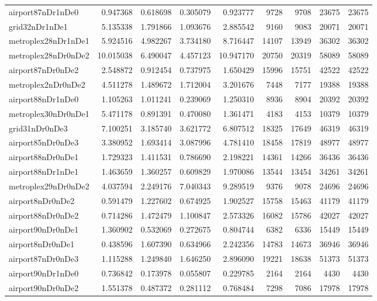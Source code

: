 \begin{longtable}{|l|r|r|r|r|r|r|r|r|}
airport87nDr1nDe0 & 0.947368 & 0.618698 & 0.305079 & 0.923777 & 9728 & 9708 & 23675 & 23675 \\
grid32nDr1nDe1 & 5.135338 & 1.791866 & 1.093676 & 2.885542 & 9160 & 9083 & 20071 & 20071 \\
metroplex28nDr1nDe1 & 5.924516 & 4.982267 & 3.734180 & 8.716447 & 14107 & 13949 & 36302 & 36302 \\
metroplex28nDr0nDe2 & 10.015038 & 6.490047 & 4.457123 & 10.947170 & 20750 & 20319 & 58089 & 58089 \\
airport87nDr0nDe2 & 2.548872 & 0.912454 & 0.737975 & 1.650429 & 15996 & 15751 & 42522 & 42522 \\
metroplex2nDr0nDe2 & 4.511278 & 1.489672 & 1.712004 & 3.201676 & 7448 & 7177 & 19388 & 19388 \\
airport88nDr1nDe0 & 1.105263 & 1.011241 & 0.239069 & 1.250310 & 8936 & 8904 & 20392 & 20392 \\
metroplex30nDr0nDe1 & 5.471178 & 0.891391 & 0.470080 & 1.361471 & 4183 & 4153 & 10379 & 10379 \\
grid31nDr0nDe3 & 7.100251 & 3.185740 & 3.621772 & 6.807512 & 18325 & 17649 & 46319 & 46319 \\
airport85nDr0nDe3 & 3.380952 & 1.693414 & 3.087996 & 4.781410 & 18458 & 17819 & 48977 & 48977 \\
airport88nDr0nDe1 & 1.729323 & 1.411531 & 0.786690 & 2.198221 & 14361 & 14266 & 36436 & 36436 \\
airport88nDr1nDe1 & 1.463659 & 1.360257 & 0.609829 & 1.970086 & 13544 & 13454 & 34261 & 34261 \\
metroplex29nDr0nDe2 & 4.037594 & 2.249176 & 7.040343 & 9.289519 & 9376 & 9078 & 24696 & 24696 \\
airport8nDr0nDe2 & 0.591479 & 1.227602 & 0.674925 & 1.902527 & 15758 & 15463 & 41179 & 41179 \\
airport88nDr0nDe2 & 0.714286 & 1.472479 & 1.100847 & 2.573326 & 16082 & 15786 & 42027 & 42027 \\
airport90nDr0nDe1 & 1.360902 & 0.532069 & 0.272675 & 0.804744 & 6382 & 6336 & 15449 & 15449 \\
airport8nDr0nDe1 & 0.438596 & 1.607390 & 0.634966 & 2.242356 & 14783 & 14673 & 36946 & 36946 \\
airport87nDr0nDe3 & 1.115288 & 1.249840 & 1.646250 & 2.896090 & 19221 & 18638 & 51373 & 51373 \\
airport90nDr1nDe0 & 0.736842 & 0.173978 & 0.055807 & 0.229785 & 2164 & 2164 & 4430 & 4430 \\
airport90nDr0nDe2 & 1.551378 & 0.487372 & 0.281112 & 0.768484 & 7298 & 7086 & 17978 & 17978 \\

\end{longtable}
